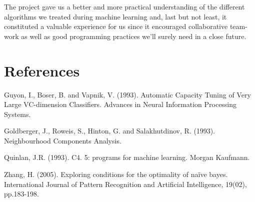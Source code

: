 \documentclass[11pt,a4paper]{article}
\begin{document}
The project gave us a better and more practical understanding of the different algorithms we treated during machine learning and, last but not least, it constituted a valuable experience for us since it encouraged collaborative team-work as well as good programming practices we'll surely need in a close future.  

\section*{References}
Guyon, I., Boser, B. and Vapnik, V. (1993). Automatic Capacity Tuning of Very Large VC-dimension Classifiers. Advances in Neural Information Processing Systems.

Goldberger, J., Roweis, S., Hinton, G. and Salakhutdinov, R. (1993). Neighbourhood Components Analysis.

Quinlan, J.R. (1993). C4. 5: programs for machine learning. Morgan Kaufmann.

Zhang, H. (2005). Exploring conditions for the optimality of naïve bayes. International Journal of Pattern Recognition and Artificial Intelligence, 19(02), pp.183-198.

\newpage
\appendix
\end{document}
